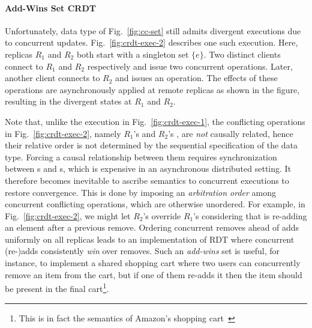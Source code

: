 \noindent\paragraph{Add-Wins Set CRDT} Unfortunately, 
data type of Fig.~\ref{fig:cc-set} still admits divergent executions
due to concurrent updates.  Fig.~\ref{fig:crdt-exec-2} describes one
such execution. Here, replicas $R_1$ and $R_2$ both start with a
singleton set $\{e\}$.  Two distinct clients connect to $R_1$ and
$R_2$ respectively and issue two concurrent 
operations. Later, another client connects to $R_2$ and issues an
 operation. The effects of these operations are
asynchronously applied at remote replicas as shown in the figure,
resulting in the divergent states at $R_1$ and $R_2$.

Note that, unlike the execution in Fig.~\ref{fig:crdt-exec-1}, the
conflicting operations in Fig.~\ref{fig:crdt-exec-2}, namely $R_1$'s
 and $R_2$'s , are \emph{not} causally related,
hence their relative order is not determined by the sequential
specification of the data type. Forcing a causal relationship between
them requires synchronization between s and s,
which is expensive in an asynchronous distributed setting. It
therefore becomes inevitable to ascribe semantics to concurrent
executions to restore convergence. This is done by imposing an
\emph{arbitration order} among concurrent conflicting operations,
which are otherwise unordered. For example, in
Fig.~\ref{fig:crdt-exec-2}, we might let $R_2$'s  override
$R_1$'s  considering that  is re-adding an
element after a previous remove. Ordering concurrent removes ahead
of adds uniformly on all replicas leads to an implementation of
 RDT where concurrent (re-)adds consistently \emph{win}
over removes. Such an \emph{add-wins} set is useful, for instance, to
implement a shared shopping cart where two users can concurrently
remove an item from the cart, but if one of them re-adds it then the
item should be present in the final cart\footnote{This is in fact the
semantics of Amazon's shopping cart~\cite{dynamo}}.

